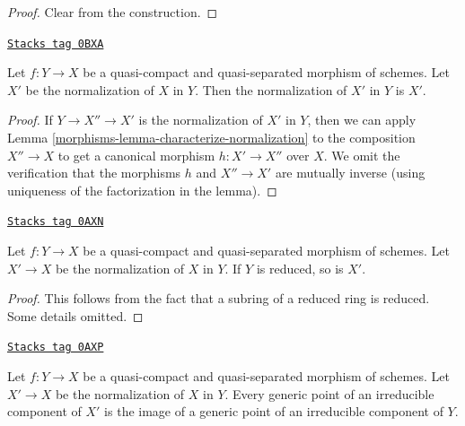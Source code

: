 \begin{proof}
Clear from the construction.
\end{proof}

\begin{lemma}
\label{morphisms-lemma-normalization-is-normalization}
\href{https://stacks.math.columbia.edu/tag/0BXA}{\texttt{Stacks tag 0BXA}}

Let $f : Y \to X$ be a quasi-compact and quasi-separated morphism of schemes.
Let $X'$ be the normalization of $X$ in $Y$. Then the normalization of
$X'$ in $Y$ is $X'$.
\end{lemma}

\begin{proof}

If $Y \to X'' \to X'$ is the normalization of $X'$ in $Y$, then
we can apply Lemma \ref{morphisms-lemma-characterize-normalization}
to the composition $X'' \to X$ to get a canonical morphism
$h : X' \to X''$ over $X$. We omit the verification that the
morphisms $h$ and $X'' \to X'$ are mutually inverse (using uniqueness
of the factorization in the lemma).
\end{proof}

\begin{lemma}
\label{morphisms-lemma-normalization-in-reduced}
\href{https://stacks.math.columbia.edu/tag/0AXN}{\texttt{Stacks tag 0AXN}}

Let $f : Y \to X$ be a quasi-compact and quasi-separated morphism of schemes.
Let $X' \to X$ be the normalization of $X$ in $Y$. If $Y$ is reduced, so
is $X'$.
\end{lemma}

\begin{proof}
This follows from the fact that a subring of a reduced ring is reduced.
Some details omitted.
\end{proof}

\begin{lemma}
\label{morphisms-lemma-normalization-generic}
\href{https://stacks.math.columbia.edu/tag/0AXP}{\texttt{Stacks tag 0AXP}}

Let $f : Y \to X$ be a quasi-compact and quasi-separated morphism of schemes.
Let $X' \to X$ be the normalization of $X$ in $Y$. Every generic point of
an irreducible component of $X'$ is the image of a generic point of
an irreducible component of $Y$.
\end{lemma}

